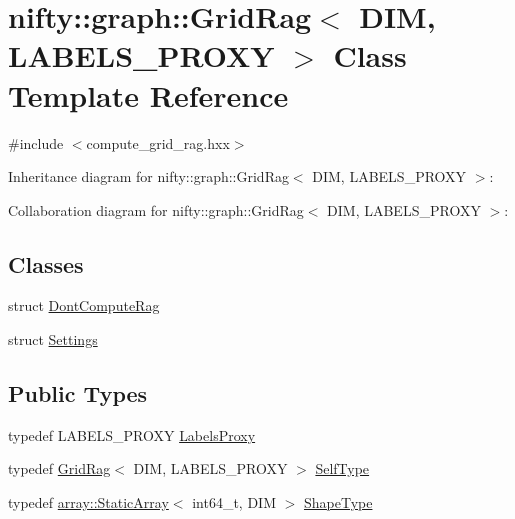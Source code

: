 \hypertarget{classnifty_1_1graph_1_1GridRag}{}\section{nifty\+:\+:graph\+:\+:Grid\+Rag$<$ D\+I\+M, L\+A\+B\+E\+L\+S\+\_\+\+P\+R\+O\+X\+Y $>$ Class Template Reference}
\label{classnifty_1_1graph_1_1GridRag}


{\ttfamily \#include $<$compute\+\_\+grid\+\_\+rag.\+hxx$>$}



Inheritance diagram for nifty\+:\+:graph\+:\+:Grid\+Rag$<$ D\+I\+M, L\+A\+B\+E\+L\+S\+\_\+\+P\+R\+O\+X\+Y $>$\+:


Collaboration diagram for nifty\+:\+:graph\+:\+:Grid\+Rag$<$ D\+I\+M, L\+A\+B\+E\+L\+S\+\_\+\+P\+R\+O\+X\+Y $>$\+:
\subsection*{Classes}
\begin{DoxyCompactItemize}
\item 
struct \hyperlink{structnifty_1_1graph_1_1GridRag_1_1DontComputeRag}{Dont\+Compute\+Rag}
\item 
struct \hyperlink{structnifty_1_1graph_1_1GridRag_1_1Settings}{Settings}
\end{DoxyCompactItemize}
\subsection*{Public Types}
\begin{DoxyCompactItemize}
\item 
typedef L\+A\+B\+E\+L\+S\+\_\+\+P\+R\+O\+X\+Y \hyperlink{classnifty_1_1graph_1_1GridRag_ad3146f72301da4f45b51e3b692776cf1}{Labels\+Proxy}
\item 
typedef \hyperlink{classnifty_1_1graph_1_1GridRag}{Grid\+Rag}$<$ D\+I\+M, L\+A\+B\+E\+L\+S\+\_\+\+P\+R\+O\+X\+Y $>$ \hyperlink{classnifty_1_1graph_1_1GridRag_aa5e47cff6ae70d13254abc3382b3b166}{Self\+Type}
\item 
typedef \hyperlink{namespacenifty_1_1array_a683f151f19c851754e0c6d55ed16a0c2}{array\+::\+Static\+Array}$<$ int64\+\_\+t, D\+I\+M $>$ \hyperlink{classnifty_1_1graph_1_1GridRag_a3693e007e1419dec9751cca751a1061d}{Shape\+Type}
\end{DoxyCompactItemize}
